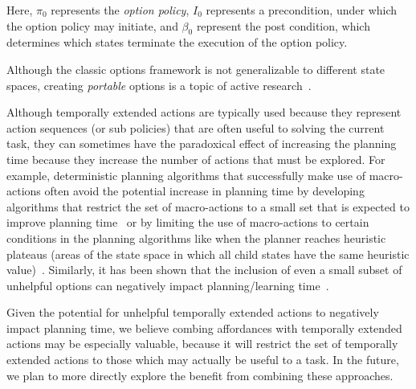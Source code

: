 \documentclass[]{article}
\begin{document}
Here, $\pi_0$ represents the {\it option policy}, $I_0$ represents
a precondition, under which the option policy may initiate, and 
$\beta_0$ represent the post condition, which determines which 
states terminate the execution of the option policy.

Although the classic options framework is not generalizable to different state spaces,
creating {\em portable} options is a topic of active research~\citep{konidaris07,konidaris2009efficient,Ravindran03analgebraic,croonenborghs2008learning,andre2002state,konidaris2012transfer}.

Although temporally extended actions are typically used
because they represent action sequences (or sub policies) that are often useful to solving
the current task, they can sometimes have the paradoxical effect
of increasing the planning time because they increase the number of actions that must be explored.
For example, deterministic planning algorithms that successfully make use of macro-actions often avoid the potential increase
in planning time by developing algorithms that restrict the set of macro-actions to a small set that is expected to improve planning time~\cite{Botea:2005kx,Newton:2005vn} or by limiting the use of macro-actions to certain conditions
in the planning algorithms like when the planner reaches heuristic plateaus (areas of the state space in which all child states have the same heuristic value)~\cite{Coles:2007ys}. Similarly, it has been shown that the inclusion
of even a small subset of unhelpful options can negatively impact planning/learning time~\cite{Jong:2008zr}.

Given the potential for unhelpful temporally extended actions to negatively impact planning time, we believe combing affordances with temporally extended actions
may be especially valuable, because it will restrict the set of temporally extended actions to those
which may actually be useful to a task. In the future, we plan to more directly explore the benefit from combining
these approaches.


\end{document}
